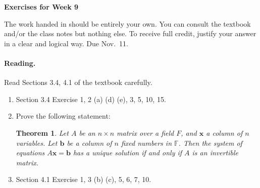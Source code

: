 \documentclass[11pt]{article}
\theoremstyle{plain}
\newtheorem{thm}{Theorem}
\theoremstyle{definition}
\def\F{\mathbb F}
\begin{document}
\begin{center}
{\Large \bf Exercises for Week 9}
\end{center}
The work handed in should be entirely your own. You can consult the textbook and/or the class notes but nothing else. To receive full credit, justify your answer in a clear and logical way. Due Nov.~11.

\paragraph{Reading.} Read Sections 3.4, 4.1  of the textbook carefully.

\begin{enumerate}
\item Section 3.4 Exercise 1, 2 (a) (d) (e), 3, 5, 10, 15.
\item Prove the following statement: 
\begin{thm}
Let $A$ be an $n\times n$ matrix over a field $F$, and $\mathbf{x}$ a column of $n$ variables. Let $\mathbf{b}$ be a column of $n$ fixed numbers in $\F$. Then the system of equations $A \mathbf{x}=\mathbf{b}$ has a unique solution if and only if $A$ is an invertible matrix.
\end{thm}
\item Section 4.1 Exercise 1, 3 (b) (c), 5, 6, 7, 10.
\end{enumerate}
\end{document}
